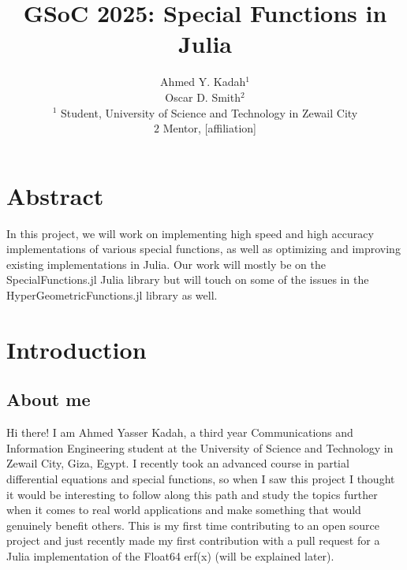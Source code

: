 \documentclass{article}
\title{GSoC 2025: Special Functions in Julia }
\author{Ahmed Y. Kadah$^1$  
\\Oscar D. Smith$^2$ 
\\$^1$ Student, University of Science and Technology in Zewail City
\\ $2$ Mentor, [affiliation]}
\date{}
\theoremstyle{mytheoremstyle}
\theoremstyle{mytheoremstyle}
\theoremstyle{myproblemstyle}
\begin{document}
    \maketitle


  \section*{Abstract}
    In this project, we will work on implementing high speed and high accuracy implementations of various special functions, as well as optimizing and improving existing implementations in Julia.
    Our work will mostly be on the SpecialFunctions.jl Julia library but will touch on some of the issues in the HyperGeometricFunctions.jl library as well. 

  \section*{Introduction}
    \subsection*{About me 
      \href{https://github.com/AhmedYKadah}{\faGithub}    
      \href{https://linkedin.com/in/ahmed-yasser-kadah-83687b269}{\faLinkedin}    
      \href{mailto:ahmadyassermo@gmail.com}{\faEnvelope[regular]}    
    }\label{sub:About} 
      Hi there! I am Ahmed Yasser Kadah, a third year Communications and Information Engineering student at the University of Science and Technology in Zewail City, Giza, Egypt.
      I recently took an advanced course in partial differential equations and special functions, so when I saw this project I thought it would be interesting to follow along this path and study the topics further when it comes to real world applications and make something that would genuinely benefit others. 
      This is my first time contributing to an open source project and just recently made my first contribution with a pull request for a Julia implementation of the Float64 erf(x) (will be explained later). 
\end{document}
